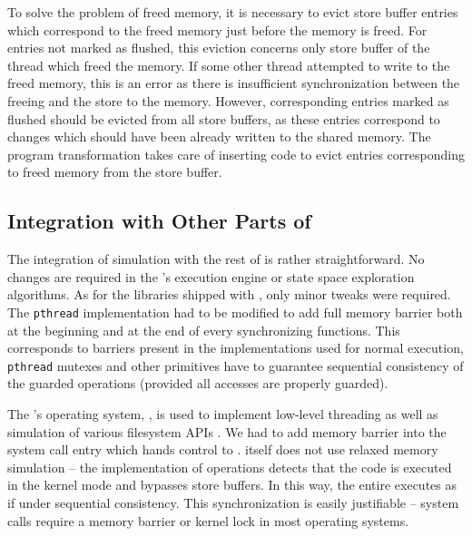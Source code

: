 To solve the problem of freed memory, it is necessary to evict store buffer entries which correspond to the freed memory just before the memory is freed.
For entries not marked as flushed, this eviction concerns only store buffer of the thread which freed the memory.
If some other thread attempted to write to the freed memory, this is an error as there is insufficient synchronization between the freeing and the store to the memory.
However, corresponding entries marked as flushed should be evicted from all store buffers, as these entries correspond to changes which should have been already written to the shared memory.
The program transformation takes care of inserting code to evict entries corresponding to freed memory from the store buffer.

\subsection{Integration with Other Parts of \divine}

The integration of \xtso simulation with the rest of \divine is rather straightforward.
No changes are required in the \divine's execution engine or state space exploration algorithms.
As for the libraries shipped with \divine, only minor tweaks were required.
The \texttt{pthread} implementation had to be modified to add full memory barrier both at the beginning and at the end of every synchronizing functions.
This corresponds to barriers present in the implementations used for normal execution, \texttt{pthread} mutexes and other primitives have to guarantee sequential consistency of the guarded operations (provided all accesses are properly guarded).

The \divine's operating system, \dios, is used to implement low-level threading as well as simulation of various filesystem APIs \cite{DIVINEToolPaper2017}.
We had to add memory barrier into the system call entry which hands control to \dios.
\dios itself does not use relaxed memory simulation -- the implementation of \xtso operations detects that the code is executed in the kernel mode and bypasses store buffers.
In this way, the entire \dios executes as if under sequential consistency.
This synchronization is easily justifiable -- system calls require a memory barrier or kernel lock in most operating systems.

